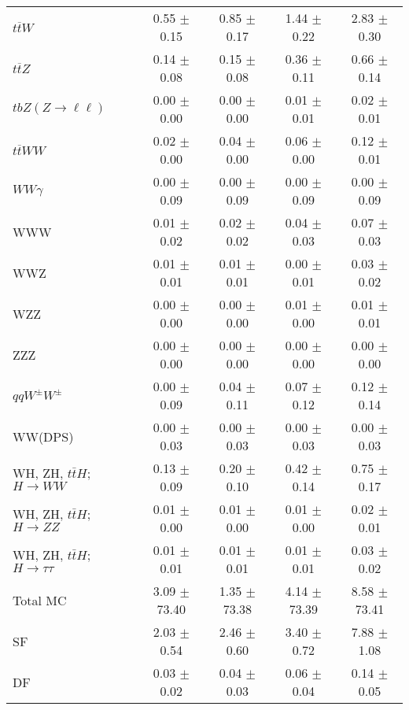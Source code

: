 \begin{tabular}{l|cccc}
                   $t\overline{t}W$ &  0.55 $\pm$  0.15 &  0.85 $\pm$  0.17 &  1.44 $\pm$  0.22 &  2.83 $\pm$  0.30 \\
                   $t\overline{t}Z$ &  0.14 $\pm$  0.08 &  0.15 $\pm$  0.08 &  0.36 $\pm$  0.11 &  0.66 $\pm$  0.14 \\
    $tbZ (Z \rightarrow \ell \ell)$ &  0.00 $\pm$  0.00 &  0.00 $\pm$  0.00 &  0.01 $\pm$  0.01 &  0.02 $\pm$  0.01 \\
                  $t\overline{t}WW$ &  0.02 $\pm$  0.00 &  0.04 $\pm$  0.00 &  0.06 $\pm$  0.00 &  0.12 $\pm$  0.01 \\
                         $WW\gamma$ &  0.00 $\pm$  0.09 &  0.00 $\pm$  0.09 &  0.00 $\pm$  0.09 &  0.00 $\pm$  0.09 \\
                                WWW &  0.01 $\pm$  0.02 &  0.02 $\pm$  0.02 &  0.04 $\pm$  0.03 &  0.07 $\pm$  0.03 \\
                                WWZ &  0.01 $\pm$  0.01 &  0.01 $\pm$  0.01 &  0.00 $\pm$  0.01 &  0.03 $\pm$  0.02 \\
                                WZZ &  0.00 $\pm$  0.00 &  0.00 $\pm$  0.00 &  0.01 $\pm$  0.00 &  0.01 $\pm$  0.01 \\
                                ZZZ &  0.00 $\pm$  0.00 &  0.00 $\pm$  0.00 &  0.00 $\pm$  0.00 &  0.00 $\pm$  0.00 \\
                 $qqW^{\pm}W^{\pm}$ &  0.00 $\pm$  0.09 &  0.04 $\pm$  0.11 &  0.07 $\pm$  0.12 &  0.12 $\pm$  0.14 \\
                            WW(DPS) &  0.00 $\pm$  0.03 &  0.00 $\pm$  0.03 &  0.00 $\pm$  0.03 &  0.00 $\pm$  0.03 \\
WH, ZH, $t\bar{t}H$; $H \rightarrow WW$ &  0.13 $\pm$  0.09 &  0.20 $\pm$  0.10 &  0.42 $\pm$  0.14 &  0.75 $\pm$  0.17 \\
WH, ZH, $t\bar{t}H$; $H \rightarrow ZZ$ &  0.01 $\pm$  0.00 &  0.01 $\pm$  0.00 &  0.01 $\pm$  0.00 &  0.02 $\pm$  0.01 \\
WH, ZH, $t\bar{t}H$; $H \rightarrow \tau\tau$ &  0.01 $\pm$  0.01 &  0.01 $\pm$  0.01 &  0.01 $\pm$  0.01 &  0.03 $\pm$  0.02 \\
\hline\hline
                           Total MC &  3.09 $\pm$ 73.40 &  1.35 $\pm$ 73.38 &  4.14 $\pm$ 73.39 &  8.58 $\pm$ 73.41 \\
\hline
                                 SF &  2.03 $\pm$  0.54 &  2.46 $\pm$  0.60 &  3.40 $\pm$  0.72 &  7.88 $\pm$  1.08 \\
                                 DF &  0.03 $\pm$  0.02 &  0.04 $\pm$  0.03 &  0.06 $\pm$  0.04 &  0.14 $\pm$  0.05 \\

\end{tabular}
